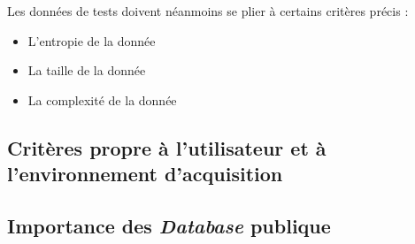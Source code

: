 Les données de tests doivent néanmoins se plier à certains critères précis :

\begin{itemize}
\item L'entropie de la donnée
\item La taille de la donnée
\item La complexité de la donnée
\end{itemize}

\subsection{Critères propre à l'utilisateur et à l'environnement d'acquisition}



\subsection{Importance des \textit{Database} publique}
